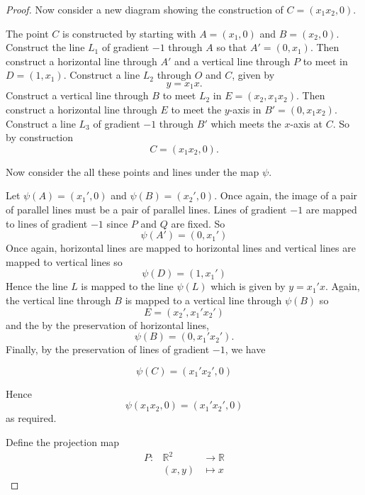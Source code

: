 \documentclass[honours]{UNSWthesis}
\newcommand{\R}{\mathbb{R}}
\newcommand{\1}{\mathbf{e}_{1}}
\newcommand{\2}{\mathbf{e}_{3}}
\newcommand{\3}{\mathbf{e}_{3}}
\begin{document}
\begin{proof}
Now consider a new diagram showing the construction of $C=(x_{1}x_{2},0)$.


The point $C$ is constructed by starting with $A=(x_{1},0)$ and $B=(x_{2},0)$. Construct the line $L_1$ of gradient $-1$ through $A$ so that $A'=(0,x_{1})$. Then construct a horizontal line through $A'$ and a vertical line through $P$ to meet in $D=(1,x_{1})$. Construct a line $L_2$ through $O$ and $C$, given by 
$$y=x_{1}x .$$ 
Construct a vertical line through $B$ to meet $L_2$ in $E=(x_{2}, x_{1}x_{2})$. Then construct a horizontal line through $E$ to meet the $y$-axis in $B'=(0,x_{1}x_{2})$. Construct a line $L_3$ of gradient $-1$ through $B'$ which meets the $x$-axis at $C$. So by construction 
\[
C=(x_1 x_2,0).
\]

Now consider the all these points and lines under the map $\psi$. 


Let $\psi(A)=(x_{1}',0)$ and $\psi(B)=(x_{2}',0) $. Once again, the image of a pair of parallel lines must be a pair of parallel lines. Lines of gradient $-1$ are mapped to lines of gradient $-1$ since $P$ and $Q$ are fixed. So 
\[
\psi(A')=(0,x_{1}')
\]
Once again, horizontal lines are mapped to horizontal lines and vertical lines are mapped to vertical lines so
\[
\psi(D)=(1,x_{1}')
\]
Hence the line $L$ is mapped to the line $\psi(L)$ which is given by $y=x_{1}'x$. Again, the vertical line through $B$ is mapped to a vertical line through $\psi(B)$ so 
\[
E=(x_{2}',x_{1}'x_{2}')
\]
and the by the preservation of horizontal lines, 
\[
\psi(B)=(0,x_{1}'x_{2}').
\]
Finally, by the preservation of lines of gradient $-1$, we have 

\[
\psi(C)=(x_{1}'x_{2}',0)
\]

Hence 
\begin{equation}\label{axismultmap}
\psi(x_{1}x_{2},0)= (x_{1}'x_{2}',0)
\end{equation}
as required.


Define the projection map
\begin{eqnarray*}
P: &\R^{2}& \longrightarrow \R \\
&(x,y)& \longmapsto x
\end{eqnarray*}


\end{proof}
\end{document}
